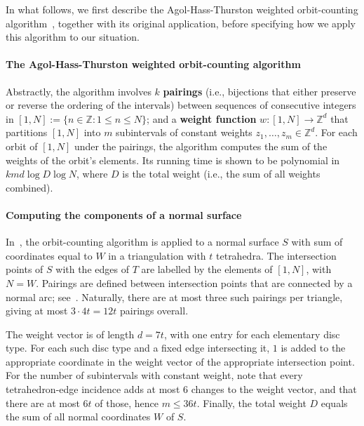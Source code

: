 \documentclass[10pt,a4paper]{amsart}
\begin{document}
In what follows, we first describe the Agol-Hass-Thurston weighted orbit-counting algorithm~\cite{agol2006computational}, together with its original application, before specifying how we apply this algorithm to our situation.

\paragraph*{The Agol-Hass-Thurston weighted orbit-counting algorithm}

Abstractly, the algorithm involves $k$ \textbf{pairings} (i.e., bijections that either preserve or reverse the ordering of the intervals) between sequences of consecutive integers in $[1,N] := \{ n\in\mathbb{Z} : 1\leqslant n\leqslant N \}$;
and a \textbf{weight function} $w:[1,N]\to\mathbb{Z}^d$ that partitions $[1,N]$ into $m$ subintervals of constant weights $z_1,\ldots,z_m \in \mathbb{Z}^d$.
For each orbit of $[1,N]$ under the pairings, the algorithm computes the sum of the weights of the orbit's elements.
Its running time is shown to be polynomial in $kmd \log{D} \log{N}$, where $D$ is the total weight (i.e., the sum of all weights combined).

\paragraph*{Computing the components of a normal surface}

In~\cite{agol2006computational}, the orbit-counting algorithm is applied to a normal surface $S$ with sum of coordinates equal to $W$ in a triangulation with $t$ tetrahedra.
The intersection points of $S$ with the edges of $T$ are labelled by the elements of $[1,N]$, with $N=W$.
Pairings are defined between intersection points that are connected by a normal arc;
see~\cite[Figure~4]{agol2006computational}.
Naturally, there are at most three such pairings per triangle, giving at most $3\cdot 4t = 12 t$ pairings overall.

The weight vector is of length $d=7t$, with one entry for each elementary disc type.
For each such disc type and a fixed edge intersecting it, $1$ is added to the appropriate coordinate in the weight vector of the appropriate intersection point.
For the number of subintervals with constant weight, note that every tetrahedron-edge incidence adds at most $6$ changes to the weight vector, and that there are at most $6t$ of those, hence $m \leqslant 36t$.
Finally, the total weight $D$ equals the sum of all normal coordinates $W$ of $S$.
\end{document}
